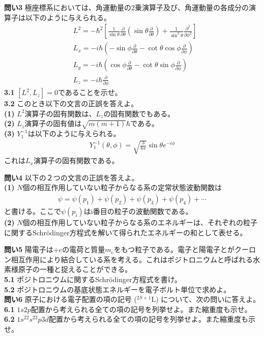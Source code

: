 \documentclass[11pt,pra,aps]{revtex4}
\begin{document}
\noindent
{\bf 問い3} 極座標系においては、角運動量の2乗演算子及び、角運動量の各成分の演算子は以下のように与えられる。
\begin{align}
  &L^2 = -\hbar^2\left[\frac{1}{\sin\theta}\frac{\partial}{\partial\theta}\left(\sin\theta\frac{\partial}{\partial\theta}\right)+\frac{1}{\sin^2\theta}\frac{\partial^2}{\partial\phi^2}\right]\\
  &L_x = -i\hbar\left(-\sin\phi\frac{\partial}{\partial \theta}-\cot\theta\cos\phi\frac{\partial}{\partial\phi}\right)\\
  &L_y = -i\hbar\left(\cos\phi\frac{\partial}{\partial \theta}-\cot\theta\sin\phi\frac{\partial}{\partial\phi}\right)\\    
  &L_z = -i\hbar\frac{\partial}{\partial \phi}
\end{align}
\noindent
{\bf 3.1} $[L^2,L_z]=0$であることを示せ。\\
\noindent
{\bf 3.2} このとき以下の文言の正誤を答えよ。\\
\noindent    
{\bf (1)} $L^2$演算子の固有関数は、$L_z$の固有関数でもある。\\
\noindent        
{\bf (2)} $L_z$演算子の固有値は$\sqrt{m(m+1)}\hbar$である。\\
\noindent
{\bf (3)} $Y^{-1}_1$は以下のように与えられる。
\begin{align}
  Y^{-1}_1(\theta,\phi)=\sqrt{\frac{3}{8\pi}}\sin\theta e^{-i\phi}
\end{align}
これは$L_x$演算子の固有関数である。

\noindent
{\bf 問い4} 以下の２つの文言の正誤を答えよ。\\
\noindent
{\bf (1)} $N$個の相互作用していない粒子からなる系の定常状態波動関数は
\begin{align}
  \psi = \psi(p_1) + \psi(p_2) + \psi(p_3) + \psi(p_4) + \cdots
\end{align}
と書ける。ここで$\psi(p_i)$はi番目の粒子の波動関数である。\\
\noindent
{\bf (2)} $N$個の相互作用していない粒子からなる系のエネルギーは、それぞれの粒子に関するSchr\"odinger方程式を解いて得られたエネルギーの和として表せる。

\noindent
{\bf 問い5} 陽電子は+$e$の電荷と質量$m_e$をもつ粒子である。電子と陽電子とがクーロン相互作用により結合している系を考える。これはポジトロニウムと呼ばれる水素様原子の一種と捉えることができる。\\
\noindent
{\bf 5.1} ポジトロニウムに関するSchr\"odinger方程式を書け。\\
\noindent
{\bf 5.2} ポジトロニウムの基底状態エネルギーを電子ボルト単位で求めよ。\\

\noindent
{\bf 問い6} 原子における電子配置の項の記号 (${}^{2S+1}\text{L}$) について、次の問いに答えよ。\\
\noindent
{\bf 6.1} $1s2p$配置から考えられる全ての項の記号を列挙せよ。また縮重度も示せ。\\
\noindent
{\bf 6.2} $1s^22s^22p3d$配置から考えられる全ての項の記号を列挙せよ。また縮重度も示せ。
    
\end{document}
